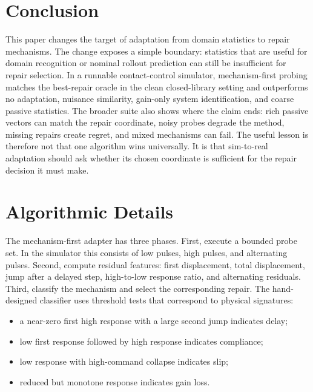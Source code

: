 \documentclass{article}
\begin{document}
\section{Conclusion}

This paper changes the target of adaptation from domain statistics to repair
mechanisms. The change exposes a simple boundary: statistics that are useful for
domain recognition or nominal rollout prediction can still be insufficient for
repair selection. In a runnable contact-control simulator, mechanism-first
probing matches the best-repair oracle in the clean closed-library setting and
outperforms no adaptation, nuisance similarity, gain-only system identification,
and coarse passive statistics. The broader suite also shows where the claim
ends: rich passive vectors can match the repair coordinate, noisy probes degrade
the method, missing repairs create regret, and mixed mechanisms can fail. The
useful lesson is therefore not that one algorithm wins universally. It is that
sim-to-real adaptation should ask whether its chosen coordinate is sufficient
for the repair decision it must make.




\appendix
\renewcommand{\thesection}{\arabic{section}}
\setcounter{section}{0}

\section{Algorithmic Details}

The mechanism-first adapter has three phases. First, execute a bounded probe
set. In the simulator this consists of low pulses, high pulses, and alternating
pulses. Second, compute residual features: first displacement, total
displacement, jump after a delayed step, high-to-low response ratio, and
alternating residuals. Third, classify the mechanism and select the corresponding
repair. The hand-designed classifier uses threshold tests that correspond to
physical signatures:
\begin{itemize}
    \item a near-zero first high response with a large second jump indicates
    delay;
    \item low first response followed by high response indicates compliance;
    \item low response with high-command collapse indicates slip;
    \item reduced but monotone response indicates gain loss.
\end{itemize}
\end{document}
